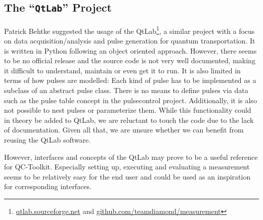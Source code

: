 \documentclass[a4paper,12pt]{article}
\begin{document}
\subsection{The ``\texttt{QtLab}'' Project}
Patrick Behtke suggested the usage of the QtLab\footnote{\href{http://qtlab.sourceforge.net/}{qtlab.sourceforge.net} and \href{https://github.com/teamdiamond/measurement}{github.com/teamdiamond/measurement}}, a similar project with a focus on data acquisition/analysis and pulse generation for quantum transportation. It is written in Python following an object oriented approach. However, there seems to be no official release and the source code is not very well documented, making it difficult to understand, maintain or even get it to run. It is also limited in terms of how pulses are modelled: Each kind of pulse has to be implemented as a subclass of an abstract pulse class. There is no means to define pulses via data such as the pulse table concept in the pulsecontrol project. Additionally, it is also not possible to nest pulses or parameterize them. While this functionality could in theory be added to QtLab, we are reluctant to touch the code due to the lack of documentation. Given all that, we are unsure whether we can benefit from reusing the QtLab software.\par
However, interfaces and concepts of the QtLab may prove to be a useful reference for QC-Toolkit. Especially setting up, executing and evaluating a measurement seems to be relatively easy for the end user and could be used as an inspiration for corresponding interfaces.

\end{document}

